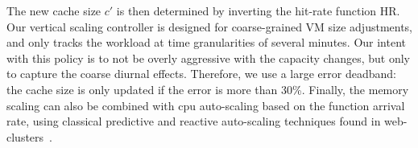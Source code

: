 \noindent The new cache size $c'$ is then determined by inverting the hit-rate function $\text{HR}$.
Our vertical scaling controller is designed for coarse-grained VM size adjustments, and only tracks the workload at time granularities of several minutes. 
Our intent with this policy is to not be overly aggressive with the capacity changes, but only to capture the coarse diurnal effects. 
Therefore, we use a large error deadband: the cache size is only updated if the error is more than 30\%. 
Finally, the memory scaling can also be combined with cpu auto-scaling based on the function arrival rate, using classical predictive and reactive auto-scaling techniques found in web-clusters~\cite{gandhi2012autoscale}. 










